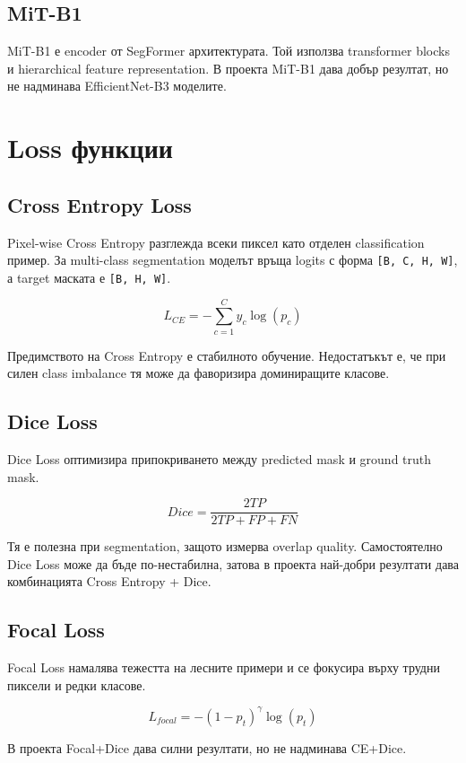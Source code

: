 \documentclass[12pt,a4paper]{article}
\newcommand{\code}[1]{\texttt{#1}}
\begin{document}
\subsection{MiT-B1}

MiT-B1 е encoder от SegFormer архитектурата. Той използва transformer blocks и hierarchical feature representation. В проекта MiT-B1 дава добър резултат, но не надминава EfficientNet-B3 моделите.

\section{Loss функции}

\subsection{Cross Entropy Loss}

Pixel-wise Cross Entropy разглежда всеки пиксел като отделен classification пример. За multi-class segmentation моделът връща logits с форма \code{[B, C, H, W]}, а target маската е \code{[B, H, W]}.

\[
L_{CE} = - \sum_{c=1}^{C} y_c \log(p_c)
\]

Предимството на Cross Entropy е стабилното обучение. Недостатъкът е, че при силен class imbalance тя може да фаворизира доминиращите класове.

\subsection{Dice Loss}

Dice Loss оптимизира припокриването между predicted mask и ground truth mask.

\[
Dice = \frac{2TP}{2TP + FP + FN}
\]

Тя е полезна при segmentation, защото измерва overlap quality. Самостоятелно Dice Loss може да бъде по-нестабилна, затова в проекта най-добри резултати дава комбинацията Cross Entropy + Dice.

\subsection{Focal Loss}

Focal Loss намалява тежестта на лесните примери и се фокусира върху трудни пиксели и редки класове.

\[
L_{focal} = - (1 - p_t)^\gamma \log(p_t)
\]

В проекта Focal+Dice дава силни резултати, но не надминава CE+Dice.
\end{document}
